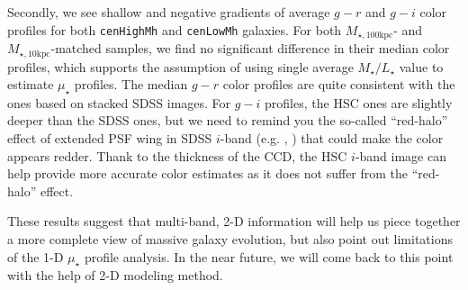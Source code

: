 \documentclass{emulateapj}
\def\rbcg{\texttt{cenHighMh}}
\def\nbcg{\texttt{cenLowMh}}
\def\mstar{{$M_{\star}$}}
\def\minn{{$M_{\star,10\mathrm{kpc}}$}}
\def\mtot{{$M_{\star,100\mathrm{kpc}}$}}
\def\m2l{{$M_{\star}/L_{\star}$}}
\def\mden{{$\mu_{\star}$}}
\begin{document}
\begin{CJK*}{UTF8}{gbsn}
    Secondly, we see shallow and negative gradients of average $g-r$ and $g-i$ color 
    profiles for both \rbcg{} and \nbcg{} galaxies. 
    For both \mtot{}- and \minn{}-matched samples, we find no significant difference
    in their median color profiles, which supports the assumption of using single 
    average \m2l{} value to estimate \mden{} profiles.
    The median $g-r$ color profiles are quite consistent with the ones based on 
    stacked SDSS images. 
    For $g-i$ profiles, the HSC ones are slightly deeper than the SDSS ones, but we 
    need to remind you the so-called ``red-halo'' effect of extended PSF wing in 
    SDSS $i$-band (e.g. \citealt{Wu2005}, \citealt{Tal2011}) that could make the 
    color appears redder.
    Thank to the thickness of the CCD, the HSC $i$-band image can help provide more 
    accurate color estimates as it does not suffer from the ``red-halo'' effect.
    
    These results suggest that multi-band, 2-D information will help us piece together
    a more complete view of massive galaxy evolution, but also point out limitations 
    of the 1-D \mden{} profile analysis. 
    In the near future, we will come back to this point with the help of 2-D modeling
    method. 
    
    

        

\end{CJK*}
\end{document}
